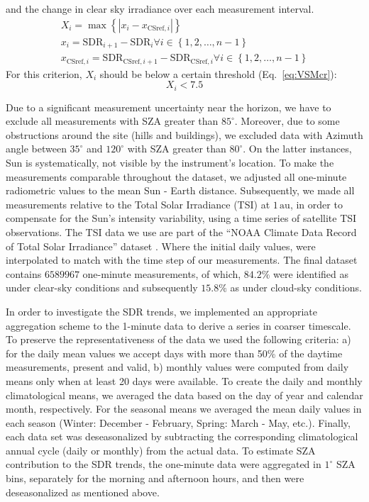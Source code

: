 \documentclass[An awesome
journal,,,moreauthors,pdftex]{Definitions/mdpi}
\begin{document}
\begin{enumerate}
  and the change in clear sky irradiance over each measurement interval.
  \begin{gather}
    X_i = \max{\left \{ \left | x_i - x_{\text{CSref},i} \right | \right \}} \label{eq:VSM3} \\
    x_i = \text{SDR}_{i+1} - \text{SDR}_{i} \forall i \in \left \{ 1, 2, \ldots, n-1 \right \} \label{eq:VSM1} \\
    x_{\text{CSref},i} = \text{SDR}_{\text{CSref},i+1} - \text{SDR}_{\text{CSref},i} \forall i \in \left \{ 1, 2, \ldots, n-1 \right \} \label{eq:VSM2}
  \end{gather} For this criterion, \(X_i\) should be below a certain
  threshold (Eq.~\ref{eq:VSMcr}): \begin{equation}
    X_i < 7.5 \label{eq:VSMcr}
  \end{equation}
\end{enumerate}

Due to a significant measurement uncertainty near the horizon, we have
to exclude all measurements with SZA greater than \(85^\circ\).
Moreover, due to some obstructions around the site (hills and
buildings), we excluded data with Azimuth angle between \(35^\circ\) and
\(120^\circ\) with SZA greater than \(80^\circ\). On the latter
instances, Sun is systematically, not visible by the instrument's
location. To make the measurements comparable throughout the dataset, we
adjusted all one-minute radiometric values to the mean Sun - Earth
distance. Subsequently, we made all measurements relative to the Total
Solar Irradiance (TSI) at \(1\,\text{au}\), in order to compensate for
the Sun's intensity variability, using a time series of satellite TSI
observations. The TSI data we use are part of the ``NOAA Climate Data
Record of Total Solar Irradiance'' dataset \citep{Coddington2005}. Where
the initial daily values, were interpolated to match with the time step
of our measurements. The final dataset contains \(6589967\) one-minute
measurements, of which, \(84.2\%\) were identified as under clear-sky
conditions and subsequently \(15.8\%\) as under cloud-sky conditions.

In order to investigate the SDR trends, we implemented an appropriate
aggregation scheme to the 1-minute data to derive a series in coarser
timescale. To preserve the representativeness of the data we used the
following criteria: a) for the daily mean values we accept days with
more than 50\% of the daytime measurements, present and valid, b)
monthly values were computed from daily means only when at least 20 days
were available. To create the daily and monthly climatological means, we
averaged the data based on the day of year and calendar month,
respectively. For the seasonal means we averaged the mean daily values
in each season (Winter: December - February, Spring: March - May, etc.).
Finally, each data set was deseasonalized by subtracting the
corresponding climatological annual cycle (daily or monthly) from the
actual data. To estimate SZA contribution to the SDR trends, the
one-minute data were aggregated in \(1^\circ\) SZA bins, separately for
the morning and afternoon hours, and then were deseasonalized as
mentioned above.
\end{document}
